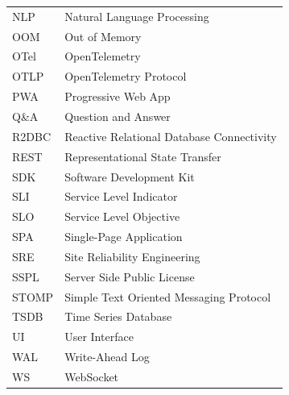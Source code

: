\begin{longtable}{@{} l p{11cm} @{}}
NLP        & Natural Language Processing \\
OOM        & Out of Memory \\
OTel      & OpenTelemetry \\
OTLP       & OpenTelemetry Protocol \\
PWA       & Progressive Web App \\
Q\&A      & Question and Answer \\
R2DBC      & Reactive Relational Database Connectivity \\
REST      & Representational State Transfer \\
SDK        & Software Development Kit \\
SLI       & Service Level Indicator \\
SLO       & Service Level Objective \\
SPA       & Single-Page Application \\
SRE       & Site Reliability Engineering \\
SSPL       & Server Side Public License \\
STOMP      & Simple Text Oriented Messaging Protocol \\
TSDB       & Time Series Database \\
UI        & User Interface \\
WAL        & Write-Ahead Log \\
WS         & WebSocket \\

\end{longtable}
